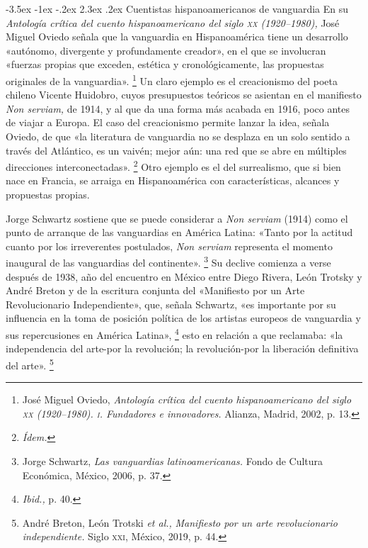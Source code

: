 \documentclass[14pt,twoside,final]{extbook} %
\makeatletter
\let\oldfootnote\footnote
\renewcommand\footnote[1]{%
\oldfootnote{\hspace{1mm}#1}}
\renewcommand\section{\@startsection {section}{1}{\z@}%
                                     {-3.5ex \@plus -1ex \@minus -.2ex}%
                                     {2.3ex \@plus .2ex}%
                                     {\normalfont\large\bfseries\sc}}
\makeatother
\begin{document}
\section{Cuentistas hispanoamericanos de vanguardia}\label{sec:cuentistas-hispanoamericanos-de-vanguardia}
En su \emph{Antología crítica del cuento hispanoamericano del siglo \textsc{xx} (1920--1980),} José Miguel Oviedo señala que la vanguardia en Hispanoamérica tiene un desarrollo «autónomo, divergente y profundamente creador», en el que se involucran «fuerzas propias que exceden, estética y cronológicamente, las propuestas originales de la vanguardia».\footnote{José Miguel Oviedo, \emph{Antología crítica del cuento hispanoamericano del siglo \textsc{xx} (1920--1980). \textsc{i}. Fundadores e innovadores.} Alianza, Madrid, 2002, p. 13.} Un claro ejemplo es el creacionismo del poeta chileno Vicente Huidobro, cuyos presupuestos teóricos se asientan en el manifiesto \emph{Non serviam,} de 1914, y al que da una forma más acabada en 1916, poco antes de viajar a Europa. El caso del creacionismo permite lanzar la idea, señala Oviedo, de que «la literatura de vanguardia no se desplaza en un solo sentido a través del Atlántico, es un vaivén; mejor aún: una red que se abre en múltiples direcciones interconectadas».\footnote{\em Ídem.} Otro ejemplo es el del surrealismo, que si bien nace en Francia, se arraiga en Hispanoamérica con características, alcances y propuestas propias.

Jorge Schwartz sostiene que se puede considerar a \emph{Non serviam} (1914) como el punto de arranque de las vanguardias en América Latina: «Tanto por la actitud cuanto por los irreverentes postulados, \emph{Non serviam} representa el momento inaugural de las vanguardias del continente».\footnote{Jorge Schwartz, \emph{Las vanguardias latinoamericanas.} Fondo de Cultura Económica, México, 2006, p. 37.} Su declive comienza a verse después de 1938, año del encuentro en México entre Diego Rivera, León Trotsky y André Breton y de la escritura conjunta del «Manifiesto por un Arte Revolucionario Independiente», que, señala Schwartz, «es importante por su influencia en la toma de posición política de los artistas europeos de vanguardia y sus repercusiones en América Latina»,\footnote{\emph{Ibid.,} p. 40.} esto en relación a que reclamaba: «la independencia del arte-por la revolución; la revolución-por la liberación definitiva del arte».\footnote{André Breton, León Trotski \emph{et al.,} \emph{Manifiesto por un arte revolucionario independiente.} Siglo \textsc{xxi}, México, 2019, p. 44.}
\end{document}
